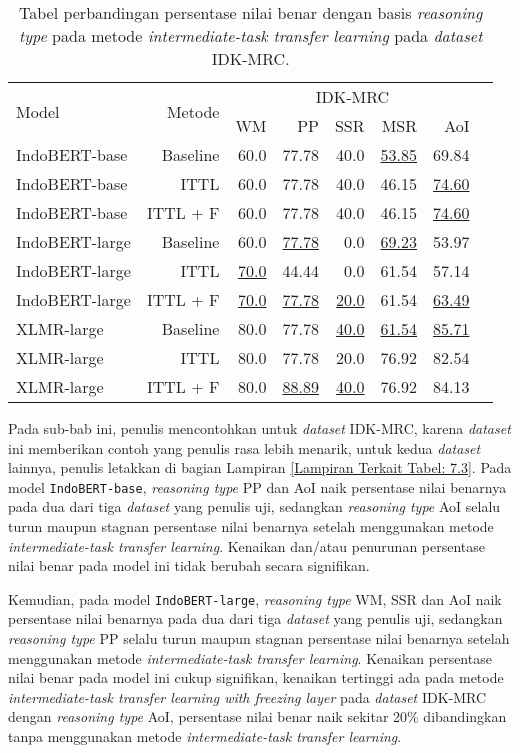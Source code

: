 \begin{table}[H]\centering
\begin{tabular}{lrrrrrrr}\toprule
\multirow{2}{*}{Model} &\multirow{2}{*}{Metode} &\multicolumn{5}{c}{IDK-MRC} \\\cmidrule{3-7}
& &WM &PP &SSR &MSR &AoI \\\midrule
IndoBERT-base &Baseline &60.0 &77.78 &40.0 &\underline{53.85} &69.84 \\
IndoBERT-base &ITTL &60.0 &77.78 &40.0 &46.15 &\underline{74.60} \\
IndoBERT-base &ITTL + F &60.0 &77.78 &40.0 &46.15 &\underline{74.60} \\
\hline
IndoBERT-large &Baseline &60.0 &\underline{77.78} &0.0 &\underline{69.23} &53.97 \\
IndoBERT-large &ITTL &\underline{70.0} &44.44 &0.0 &61.54 &57.14 \\
IndoBERT-large &ITTL + F &\underline{70.0} &\underline{77.78} &\underline{20.0} &61.54 &\underline{63.49} \\
\hline
XLMR-large &Baseline &80.0 &77.78 &\underline{40.0} &\underline{61.54} &\underline{85.71} \\
XLMR-large &ITTL &80.0 &77.78 &20.0 &76.92 &82.54 \\
XLMR-large &ITTL + F &80.0 &\underline{88.89} &\underline{40.0} &76.92 &84.13 \\
\bottomrule
\end{tabular}
\caption{Tabel perbandingan persentase nilai benar dengan basis \emph{reasoning type} pada metode \emph{intermediate-task transfer learning} pada \emph{dataset} IDK-MRC.}
\end{table}

Pada sub-bab ini, penulis mencontohkan untuk \emph{dataset} IDK-MRC, karena \emph{dataset} ini memberikan contoh yang penulis rasa lebih menarik, untuk kedua \emph{dataset} lainnya, penulis letakkan di bagian Lampiran \ref{Lampiran Terkait Tabel: 7.3}. Pada model \texttt{IndoBERT-base}, \emph{reasoning type} PP dan AoI naik persentase nilai benarnya pada dua dari tiga \emph{dataset} yang penulis uji, sedangkan \emph{reasoning type} AoI selalu turun maupun stagnan persentase nilai benarnya setelah menggunakan metode \emph{intermediate-task transfer learning}. Kenaikan dan/atau penurunan persentase nilai benar pada model ini tidak berubah secara signifikan.

Kemudian, pada model \texttt{IndoBERT-large}, \emph{reasoning type} WM, SSR dan AoI naik persentase nilai benarnya pada dua dari tiga \emph{dataset} yang penulis uji, sedangkan \emph{reasoning type} PP selalu turun maupun stagnan persentase nilai benarnya setelah menggunakan metode \emph{intermediate-task transfer learning}. Kenaikan persentase nilai benar pada model ini cukup signifikan, kenaikan tertinggi ada pada metode \emph{intermediate-task transfer learning with freezing layer} pada \emph{dataset} IDK-MRC dengan \emph{reasoning type} AoI, persentase nilai benar naik sekitar 20\% dibandingkan tanpa menggunakan metode \emph{intermediate-task transfer learning}.


